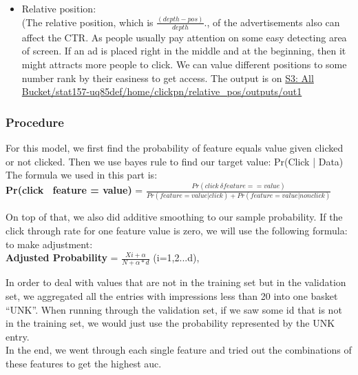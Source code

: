 \documentclass[12pt]{article}
\begin{document}
\begin{itemize}
\smallskip
 \item Relative position:\\
(The relative position, which is $\frac{(depth - pos)} { depth}$., of the advertisements also can affect the CTR. As people usually pay attention on some easy detecting area of screen. If an ad is placed right in the middle and at the beginning, then it might attracts more people to click. We can value different positions to some number rank by their easiness to get access. 
The output is on \url{S3: All Bucket/stat157-uq85def/home/clickpn/relative_pos/outputs/out1}
\end{itemize}


\subsubsection{Procedure}
For this model, we first find the probability of feature equals value given clicked or not clicked. Then we use bayes rule to find our target value: Pr(Click | Data) 
The formula we used in this part is:\\

\vspace*{-10pt}
\textbf{Pr(click \textbar\   feature = value)} = $\frac{Pr(click \ \delta feature==value)}{Pr(feature = value | click)+Pr(feature = value | nonclick)}$ 
\setlength{\parskip}{5 pt}
\smallskip

\noindent
On top of that, we also did additive smoothing to our sample probability. If the click through rate for one feature value is zero, we will use the following formula: to make adjustment:\\

\vspace*{-8pt}
\textbf{Adjusted Probability} = $\frac{Xi+ \alpha}{N + \alpha*d}$ (i=1,2...d),
\setlength{\parskip}{5 pt}
\smallskip

\noindent
In order to deal with values that are not in the training set but in the validation set, we aggregated all the entries with impressions less than 20 into one basket “UNK”. When running through the validation set, if we saw some id that is not in the training set, we would just use the probability represented by the UNK entry.\\

\vspace*{-8pt}
\noindent
In the end, we went through each single feature and tried out the combinations of these features to get the highest auc.
\vspace*{-10pt}
\end{document}
